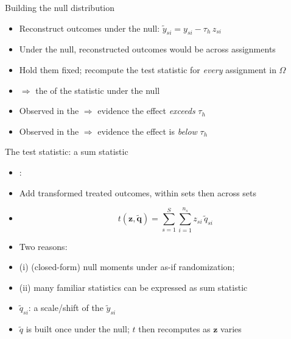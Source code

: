 \documentclass[table, xcolor = {dvipsnames}, 9pt]{beamer}
\theoremstyle{plain}
\newcommand{\mh}[1]{{\color{magenta}{#1}}}
\begin{document}
\begin{frame}[t]{Building the null distribution}
\vfill
\begin{itemize} \vfill
\item Reconstruct outcomes under the null: $\tilde{y}_{si} = y_{si} - \tau_h \, z_{si}$ \vfill
\item Under the null, reconstructed outcomes would be \mh{fixed} across assignments \vfill
\item Hold them fixed; recompute the test statistic for \emph{every} assignment in $\Omega$ \vfill
\item[] $\Rightarrow$ the \mh{randomization distribution} of the statistic under the null \vfill
\item Observed in the \mh{upper tail} $\Rightarrow$ evidence the effect \emph{exceeds} $\tau_h$ \vfill
\item Observed in the \mh{lower tail} $\Rightarrow$ evidence the effect is \emph{below} $\tau_h$ \vfill
\end{itemize} \vfill
\end{frame}
\begin{frame}[t]{The test statistic: a sum statistic}
\vfill
\begin{itemize} \vfill
\item \mh{Sum statistic}: \vfill
\item[] Add transformed treated outcomes, within sets then across sets \vfill
\item[]
\begin{equation*}
t(\bm{z}, \tilde{\bm{q}}) = \sum_{s=1}^S \sum_{i=1}^{n_s} z_{si}\, \tilde{q}_{si}
\end{equation*} \vfill
\item \mh{Why this form?} Two reasons: \vfill
\item[] (i) \mh{Known} (closed-form) null moments under as-if randomization; \vfill 
\item[] (ii) many familiar statistics can be expressed as sum statistic \vfill
\item $\tilde{q}_{si}$: a scale/shift of the \mh{reconstructed} $\tilde{y}_{si}$ \vfill
\item $\tilde{q}$ is built once under the null; $t$ then recomputes as $\bm{z}$ varies \vfill
\end{itemize} \vfill
\end{frame}
\end{document}
